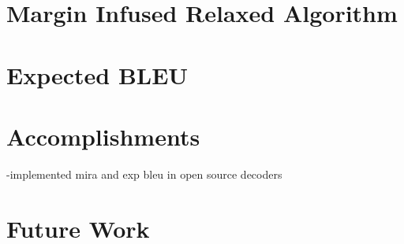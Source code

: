 \section{Margin Infused Relaxed Algorithm}
\section{Expected BLEU}
\section{Accomplishments}
-implemented mira and exp bleu in open source decoders

\section{Future Work}
